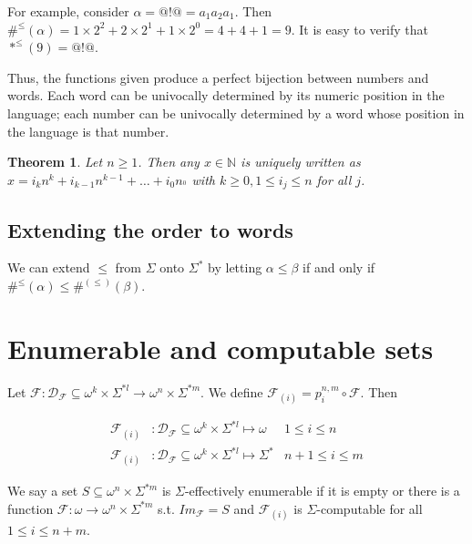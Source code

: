 \documentclass[a4paper, 12pt]{article}
\newtheorem{theorem}{Theorem}
\newtheorem{theorem}{Theorem}
\begin{document}
For example, consider $\alpha = @!@ = a_{1} a_2 a_1$. Then $\#^{\leq}( \alpha )
= 1 \times 2^2 + 2 \times 2^1 + 1 \times 2^0 = 4 + 4 + 1 = 9$. It is easy to
verify that $*^{\leq}( 9 ) = @!@$.

Thus, the functions given produce a perfect bijection between numbers and words.
Each word can be univocally determined by its numeric position in the language;
each number can be univocally determined by a word whose position in the
language is that number. 

\begin{theorem}
    Let $n \geq 1$. Then any $x \in \mathbb{N}$ is uniquely written as $x = i_k
    n^k + i_{k-1} n^{k-1} + \ldots + i_0 n_^0$ with $k \geq 0, 1 \leq i_j \leq
    n$ for all $j$.
\end{theorem}

\subsection{Extending the order to words}

We can extend $\leq$ from $\Sigma$ onto $\Sigma^{*}$ by letting $\alpha \leq
\beta $ if and only if $\#^{\leq}(\alpha) \leq \#^{(\leq)}(\beta )$.

\pagebreak


\section{Enumerable and computable sets}

Let $\mathcal{F} : \mathcal{D}_{\mathcal{F}} \subseteq \omega^{k} \times \Sigma^{*l} \to \omega^n
\times \Sigma^{*m}$. We define $\mathcal{F}_{(i)} = p_i^{n, m} \circ
\mathcal{F}$. Then

\begin{align*}
    \mathcal{F}_{(i)} &: \mathcal{D}_{\mathcal{F}} \subseteq \omega^{k} \times
    \Sigma^{*l}  \mapsto \omega & 1 \leq i \leq n\\
    \mathcal{F}_{(i)} &: \mathcal{D}_{\mathcal{F}} \subseteq \omega^{k} \times
    \Sigma^{*l} \mapsto  \Sigma^{*} & n + 1 \leq i \leq m
\end{align*}

We say a set $S \subseteq \omega^n \times \Sigma^{*m} $ is $\Sigma$-effectively
enumerable  if it is empty or there is a function $\mathcal{F} : \omega \to
\omega^n \times \Sigma^{*m}$ s.t. $Im_{\mathcal{F}} = S$ and $\mathcal{F}_{(i)}$
is $\Sigma$-computable for all $1 \leq i \leq n + m$.
\end{document}
